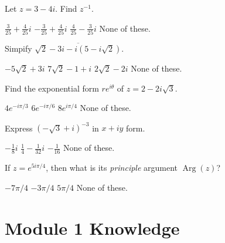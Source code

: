 \documentclass[13pt]{exam}
\begin{document}
\begin{questions}

\setcounter{question}{0}


\question Let \(z=3-4i\). Find \(z^{-1}\).
\begin{choices}
\choice \(\frac{3}{25}+\frac{4}{25}i\)
\choice \(-\frac{3}{25}+\frac{4}{25}i\)
\choice \(\frac{4}{25}-\frac{3}{25}i\)
\choice None of these. 
\end{choices}

\question Simpify \(\overline{\sqrt2 - 3i - i(5-i\sqrt2)}\). 
\begin{choices}
\choice \(-5\sqrt2 +3i\)
\choice \(7\sqrt2 -1+i\)
\choice \(2\sqrt2 -2i \)
\choice None of these. 
\end{choices}


\question Find the exponential form \(re^{i\theta}\) of \(z=2-2i\sqrt 3\).
\begin{choices}
\choice \(4e^{-i\pi/3}\)
\choice \(6e^{-i\pi/6}\)
\choice \(8e^{i\pi/4}\)
\choice None of these. 
\end{choices}

\question Express \((-\sqrt3+i)^{-3}\) in \(x+iy\) form.
\begin{choices}
\choice \(-\frac{1}{8}i\)
\choice \(\frac{1}{4}-\frac{1}{32}i\)
\choice \(-\frac{1}{16}\)
\choice None of these. 
\end{choices}

\question If \(z=e^{5i\pi/4}\), then what is its \textit{principle} argument
\(\operatorname{Arg}(z)\)?
\begin{choices}
\choice \(-7\pi/4\) 
\choice \(-3\pi/4\) 
\choice \(5\pi/4\) 
\choice None of these. 
\end{choices}
\end{questions}

\section*{Module 1 Knowledge}
\end{document}
